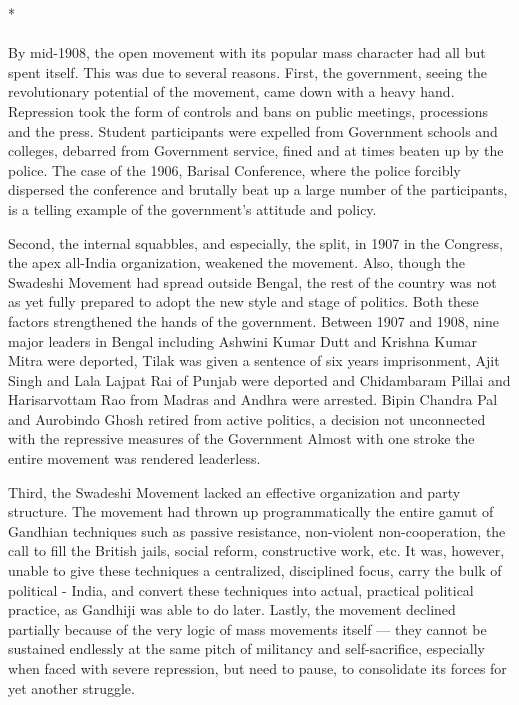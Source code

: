 \begin{center}*\end{center}

\paragraph*{}

By mid-1908, the open movement with its popular mass character had all but spent itself. This was due to several reasons. First, the government, seeing the revolutionary potential of the movement, came down with a heavy hand. Repression took the form of controls and bans on public meetings, processions and the press. Student participants were expelled from Government schools and colleges, debarred from Government service, fined and at times beaten up by the police. The case of the 1906, Barisal Conference, where the police forcibly dispersed the conference and brutally beat up a large number of the participants, is a telling example of the government's attitude and policy.

Second, the internal squabbles, and especially, the split, in 1907 in the Congress, the apex all-India organization, weakened the movement. Also, though the Swadeshi Movement had spread outside Bengal, the rest of the country was not as yet fully prepared to adopt the new style and stage of politics. Both these factors strengthened the hands of the government. Between 1907 and 1908, nine major leaders in Bengal including Ashwini Kumar Dutt and Krishna Kumar Mitra were deported, Tilak was given a sentence of six years imprisonment, Ajit Singh and Lala Lajpat Rai of Punjab were deported and Chidambaram Pillai and Harisarvottam Rao from Madras and Andhra were arrested. Bipin Chandra Pal and Aurobindo Ghosh retired from active politics, a decision not unconnected with the repressive measures of the Government Almost with one stroke the entire movement was rendered leaderless.

Third, the Swadeshi Movement lacked an effective organization and party structure. The movement had thrown up programmatically the entire gamut of Gandhian techniques such as passive resistance, non-violent non-cooperation, the call to fill the British jails, social reform, constructive work, etc. It was, however, unable to give these techniques a centralized, disciplined focus, carry the bulk of political - India, and convert these techniques into actual, practical political practice, as Gandhiji was able to do later. Lastly, the movement declined partially because of the very logic of mass movements itself --- they cannot be sustained endlessly at the same pitch of militancy and self-sacrifice, especially when faced with severe repression, but need to pause, to consolidate its forces for yet another struggle.

